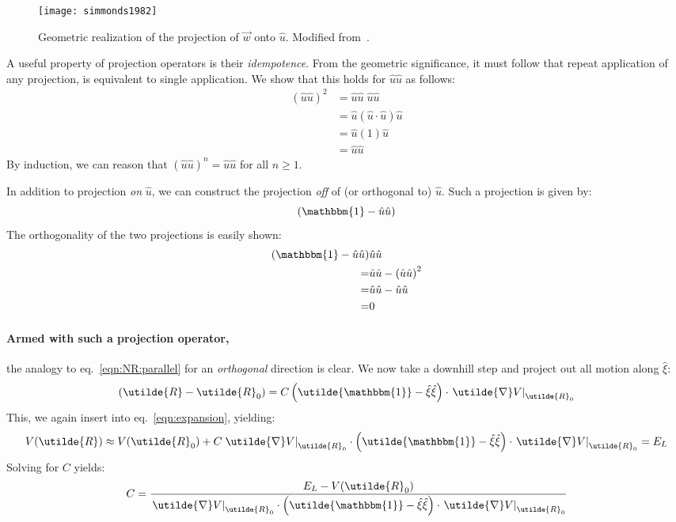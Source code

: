 \documentclass[letter,11pt]{article}
\newcommand{\cvec}[1]{\utilde{#1}}
\newcommand{\svec}[1]{\vec{#1}}
\newcommand{\laeq}[1]{\label{eqn:#1}}
\newcommand{\refeq}[1]{eq.~\ref{eqn:#1}}
\begin{document}
\begin{figure}[h]
  \centering %
    \texttt{[image: simmonds1982]}
  \caption{\label{fig:proj}Geometric realization of the projection of $\svec{w}$ onto $\hat{u}$. Modified from~\cite{simmonds:1982}.}
\end{figure}

A useful property of projection operators is their \emph{idempotence}. From the geometric significance, it must follow that repeat application of any projection, is equivalent to single application. We show that this holds for $\hat{u}\hat{u}$ as follows:
\begin{align}
  {(\hat{u}\hat{u})}^2 &= \hat{u}\hat{u} \; \hat{u}\hat{u} \\
  &= \hat{u} (\hat{u} \cdot \hat{u}) \hat{u}\\
  &= \hat{u}(1)\hat{u} \\
  &= \hat{u}\hat{u}
\end{align}
By induction, we can reason that ${(\hat{u}\hat{u})}^n = \hat{u}\hat{u}$ for all $n \ge 1$.

In addition to projection \emph{on} $\hat{u}$, we can construct the projection \emph{off} of (or orthogonal to) $\hat{u}$. Such a projection is given by:
\begin{equation}
  \left(\mathbbm{1} - \hat{u}\hat{u} \right)
\end{equation}
The orthogonality of the two projections is easily shown:
\begin{align}
  (\mathbbm{1} - \hat{u}\hat{u}) &\hat{u}\hat{u} \\
  = &\hat{u}\hat{u} - {\left( \hat{u}\hat{u} \right)}^2 \\
  = &\hat{u}\hat{u} - \hat{u}\hat{u} \\
  = &0
\end{align}

\paragraph{Armed with such a projection operator,} the analogy to \refeq{NR:parallel} for an \emph{orthogonal} direction is clear. We now take a downhill step and project out all motion along $\hat{\xi}$:
\begin{equation}\laeq{NR:orthogonal}
  (\cvec{R} - \cvec{R}_0) = C \left( \cvec{\mathbbm{1}} - \hat{\xi}\hat{\xi} \right) \cdot \left. \cvec{\nabla} V\right|_{\cvec{R}_0}
\end{equation}
This, we again insert into \refeq{expansion}, yielding:
\begin{align}
  V(\cvec{R}) \approx  V(\cvec{R}_0) + C \left. \cvec{\nabla}V\right|_{\cvec{R}_0} \cdot \left( \cvec{\mathbbm{1}} - \hat{\xi}\hat{\xi} \right) \cdot \left. \cvec{\nabla} V\right|_{\cvec{R}_0} = E_L
\end{align}
Solving for $C$ yields:
\[
  C = \frac{E_L - V(\cvec{R}_0)}{\left. \cvec{\nabla} V\right|_{\cvec{R}_0} \cdot \left( \cvec{\mathbbm{1}} - \hat{\xi}\hat{\xi} \right) \cdot \left. \cvec{\nabla} V\right|_{\cvec{R}_0}}
\]
\end{document}
